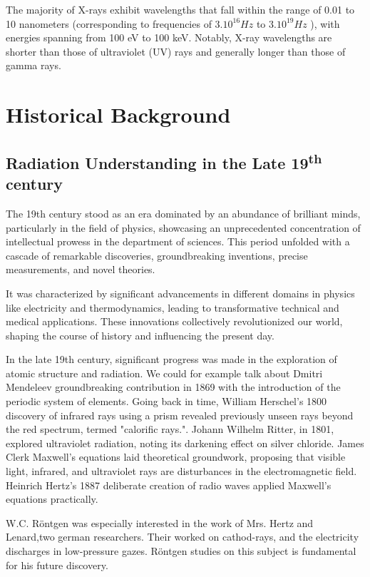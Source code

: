 \documentclass[a4paper,12pt]{report}
\begin{document}
The majority of X-rays exhibit wavelengths that fall within the range of 0.01 to 10 nanometers (corresponding to frequencies of \(3.10^{16} Hz\) to \(3.10^{19} Hz\) ), with energies spanning from 100
eV to 100 keV. Notably, X-ray wavelengths are shorter than those of ultraviolet (UV) rays and
generally longer than those of gamma rays.







\chapter{Historical Background}
\section{Radiation Understanding in the Late 19\textsuperscript{th} century}
The 19th century stood as an era dominated by an abundance of brilliant minds, particularly in
the field of physics, showcasing an unprecedented concentration of intellectual prowess in the
department of sciences. This period unfolded with a cascade of remarkable discoveries,
groundbreaking inventions, precise measurements, and novel theories.

It was characterized by significant advancements in different domains in physics like electricity
and thermodynamics, leading to transformative technical and medical applications. These
innovations collectively revolutionized our world, shaping the course of history and influencing
the present day.

In the late 19th century, significant progress was made in the exploration of atomic structure and
radiation. We could for example talk about Dmitri Mendeleev groundbreaking contribution in
1869 with the introduction of the periodic system of elements. Going back in time, William
Herschel's 1800 discovery of infrared rays using a prism revealed previously unseen rays beyond
the red spectrum, termed "calorific rays.". Johann Wilhelm Ritter, in 1801, explored ultraviolet
radiation, noting its darkening effect on silver chloride. James Clerk Maxwell's equations laid
theoretical groundwork, proposing that visible light, infrared, and ultraviolet rays are
disturbances in the electromagnetic field. Heinrich Hertz's 1887 deliberate creation of radio
waves applied Maxwell's equations practically. 

W.C. Röntgen was especially interested in the work of Mrs. Hertz and Lenard,two german researchers. Their worked on cathod-rays, and the electricity discharges in low-pressure gazes. Röntgen studies on this subject is fundamental for his future discovery. 
\end{document}

